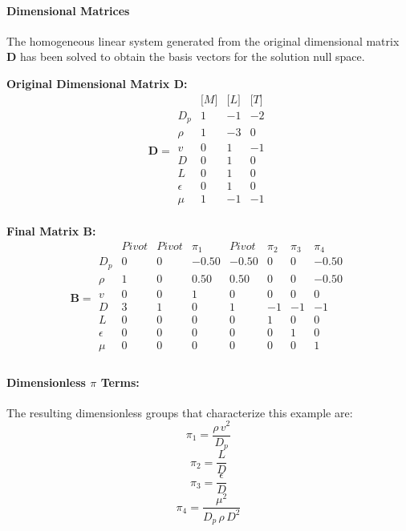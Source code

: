                 \paragraph{Dimensional Matrices}
                The homogeneous linear system generated from the original dimensional matrix $\mathbf{D}$ has been solved to obtain the basis vectors for the solution null space.

                \textbf{Original Dimensional Matrix $\mathbf{D}$:}
                \[\mathbf{D} = \begin{array}{r|rrr}
                & \text{[}M\text{]} & \text{[}L\text{]} & \text{[}T\text{]} \\
                \hline
                D_p & 1 & -1 & -2 \\
\rho & 1 & -3 & 0 \\
v & 0 & 1 & -1 \\
D & 0 & 1 & 0 \\
L & 0 & 1 & 0 \\
\epsilon & 0 & 1 & 0 \\
\mu & 1 & -1 & -1 \\

                \end{array}\]


        \textbf{Final Matrix $\mathbf{B}$:}
        \[\mathbf{B} = \begin{array}{r|rrrrrrr}
        & Pivot & Pivot & \pi_{1} & Pivot & \pi_{2} & \pi_{3} & \pi_{4} \\
        \hline
        D_p & 0 & 0 & -0.50 & -0.50 & 0 & 0 & -0.50 \\
\rho & 1 & 0 & 0.50 & 0.50 & 0 & 0 & -0.50 \\
v & 0 & 0 & 1 & 0 & 0 & 0 & 0 \\
D & 3 & 1 & 0 & 1 & -1 & -1 & -1 \\
L & 0 & 0 & 0 & 0 & 1 & 0 & 0 \\
\epsilon & 0 & 0 & 0 & 0 & 0 & 1 & 0 \\
\mu & 0 & 0 & 0 & 0 & 0 & 0 & 1 \\

        \end{array}\]

        \paragraph{Dimensionless $\pi$ Terms: }
        The resulting dimensionless groups that characterize this example are:
\begin{equation}
\pi_{1} = \frac{\rho \, v^{2}}{D_p}
\end{equation}
\begin{equation}
\pi_{2} = \frac{L}{D}
\end{equation}
\begin{equation}
\pi_{3} = \frac{\epsilon}{D}
\end{equation}
\begin{equation}
\pi_{4} = \frac{\mu^{2}}{D_p \, \rho \, D^{2}}
\end{equation}

